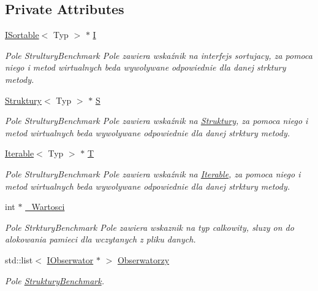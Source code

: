 \subsection*{Private Attributes}
\begin{DoxyCompactItemize}
\item 
\hyperlink{class_i_sortable}{I\-Sortable}$<$ Typ $>$ $\ast$ \hyperlink{class_struktury_benchmark_ab10e00df9ce397566d73f1a3697193f2}{I}
\begin{DoxyCompactList}\small\item\em Pole Strultury\-Benchmark Pole zawiera wskaźnik na interfejs sortujacy, za pomoca niego i metod wirtualnych beda wywolywane odpowiednie dla danej strktury metody. \end{DoxyCompactList}\item 
\hyperlink{class_struktury}{Struktury}$<$ Typ $>$ $\ast$ \hyperlink{class_struktury_benchmark_aa71bb2ddb1fb6f9e07ef8423c6225464}{S}
\begin{DoxyCompactList}\small\item\em Pole Strultury\-Benchmark Pole zawiera wskaźnik na \hyperlink{class_struktury}{Struktury}, za pomoca niego i metod wirtualnych beda wywolywane odpowiednie dla danej strktury metody. \end{DoxyCompactList}\item 
\hyperlink{class_iterable}{Iterable}$<$ Typ $>$ $\ast$ \hyperlink{class_struktury_benchmark_a1b7a323989d91e35099941977b688b22}{T}
\begin{DoxyCompactList}\small\item\em Pole Strultury\-Benchmark Pole zawiera wskaźnik na \hyperlink{class_iterable}{Iterable}, za pomoca niego i metod wirtualnych beda wywolywane odpowiednie dla danej strktury metody. \end{DoxyCompactList}\item 
int $\ast$ \hyperlink{class_struktury_benchmark_a98c2030555bbaa7fc7efe720bf22696c}{\-\_\-\-Wartosci}
\begin{DoxyCompactList}\small\item\em Pole Strktury\-Benchmark Pole zawiera wskaznik na typ calkowity, sluzy on do alokowania pamieci dla wczytanych z pliku danych. \end{DoxyCompactList}\item 
std\-::list$<$ \hyperlink{class_i_obserwator}{I\-Obserwator} $\ast$ $>$ \hyperlink{class_struktury_benchmark_a5c96eb86dfccdad59d41d478ca8d66c3}{Obserwatorzy}
\begin{DoxyCompactList}\small\item\em Pole \hyperlink{class_struktury_benchmark}{Struktury\-Benchmark}. \end{DoxyCompactList}\item 

\end{DoxyCompactItemize}

